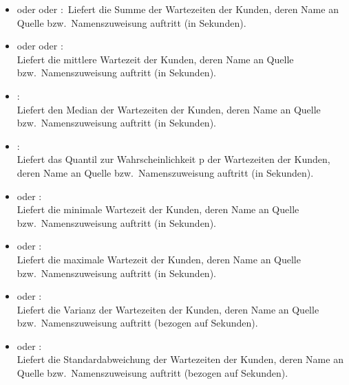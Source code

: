 \begin{itemize}

\item
{} oder  oder :\
Liefert die Summe der Wartezeiten der Kunden, deren Name an Quelle bzw.\ Namenszuweisung  auftritt (in Sekunden).

\item
{} oder  oder :\\
Liefert die mittlere Wartezeit der Kunden, deren Name an Quelle bzw.\ Namenszuweisung \cm{id} auftritt (in Sekunden).

\item
{}:\\
Liefert den Median der Wartezeiten der Kunden, deren Name an Quelle bzw.\ Namenszuweisung  auftritt (in Sekunden).

\item
{}:\\
Liefert das Quantil zur Wahrscheinlichkeit p der Wartezeiten der Kunden, deren Name an Quelle bzw.\ Namenszuweisung  auftritt (in Sekunden).

\item
{} oder :\\
Liefert die minimale Wartezeit der Kunden, deren Name an Quelle bzw.\ Namenszuweisung  auftritt (in Sekunden).

\item
{} oder :\\
Liefert die maximale Wartezeit der Kunden, deren Name an Quelle bzw.\ Namenszuweisung  auftritt (in Sekunden).

\item
{} oder :\\
Liefert die Varianz der Wartezeiten der Kunden, deren Name an Quelle bzw.\ Namenszuweisung  auftritt (bezogen auf Sekunden).

\item
{} oder :\\
Liefert die Standardabweichung der Wartezeiten der Kunden, deren Name an Quelle bzw.\ Namenszuweisung  auftritt (bezogen auf Sekunden).


\end{itemize}
